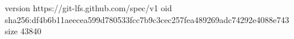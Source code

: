 version https://git-lfs.github.com/spec/v1
oid sha256:df4b6b11aeecea599d780533fcc7b9c3cec257fea489269adc74292e4088e743
size 43840

